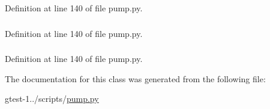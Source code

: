 \-Definition at line 140 of file pump.\-py.

\hypertarget{classpump_1_1Token_afe5ef662303b6b710ea6ee1a944bad0d}{
\subsubsection[{token\-\_\-type}]{}}\label{d2/ddc/classpump_1_1Token_afe5ef662303b6b710ea6ee1a944bad0d}


\-Definition at line 140 of file pump.\-py.

\hypertarget{classpump_1_1Token_afcc7a4b78ecd8fa7e713f8cfa0f51017}{
\subsubsection[{value}]{}}\label{d2/ddc/classpump_1_1Token_afcc7a4b78ecd8fa7e713f8cfa0f51017}


\-Definition at line 140 of file pump.\-py.



\-The documentation for this class was generated from the following file\-:\begin{DoxyCompactItemize}
\item 
gtest-\/1../scripts/\hyperlink{pump_8py}{pump.\-py}\end{DoxyCompactItemize}
